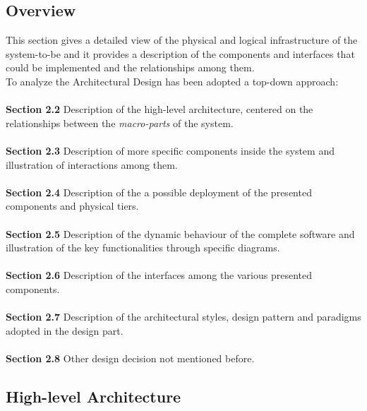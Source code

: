 \documentclass[a4paper]{article}
\begin{document}
\subsection{Overview}
This section gives a detailed view of the physical and logical infrastructure of the system-to-be and it provides a description of the components and interfaces that could be implemented and the relationships among them.\\
To analyze the Architectural Design has been adopted a top-down approach:\\ \\
\textbf{Section 2.2} Description of the high-level architecture, centered on the relationships between the \textit{macro-parts} of the system.\\ \\
\textbf{Section 2.3} Description of more specific components inside the system and illustration of interactions among them.\\ \\
\textbf{Section 2.4} Description of the a possible deployment of the presented components and physical tiers.\\ \\
\textbf{Section 2.5} Description of the dynamic behaviour of the complete software and illustration of the key functionalities through specific diagrams.\\ \\
\textbf{Section 2.6} Description of the interfaces among the various presented components.\\ \\
\textbf{Section 2.7} Description of the architectural styles, design pattern and paradigms adopted in the design part.\\ \\
\textbf{Section 2.8} Other design decision not mentioned before.
\clearpage


\subsection{High-level Architecture}

\clearpage
\end{document}
